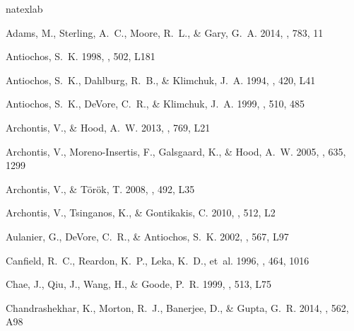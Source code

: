 \documentclass[twocolumn]{aastex6}
\begin{document}
\begin{thebibliography}{}
\expandafter\ifx\csname natexlab\endcsname\relax\def\natexlab#1{#1}\fi

{Adams}, M., {Sterling}, A.~C., {Moore}, R.~L., \& {Gary}, G.~A. 2014, \apj,
  783, 11

{Antiochos}, S.~K. 1998, \apjl, 502, L181

{Antiochos}, S.~K., {Dahlburg}, R.~B., \& {Klimchuk}, J.~A. 1994, \apjl, 420,
  L41

{Antiochos}, S.~K., {DeVore}, C.~R., \& {Klimchuk}, J.~A. 1999, \apj, 510, 485

{Archontis}, V., \& {Hood}, A.~W. 2013, \apjl, 769, L21

{Archontis}, V., {Moreno-Insertis}, F., {Galsgaard}, K., \& {Hood}, A.~W. 2005,
  \apj, 635, 1299

{Archontis}, V., \& {T{\"o}r{\"o}k}, T. 2008, \aap, 492, L35

{Archontis}, V., {Tsinganos}, K., \& {Gontikakis}, C. 2010, \aap, 512, L2

{Aulanier}, G., {DeVore}, C.~R., \& {Antiochos}, S.~K. 2002, \apjl, 567, L97

{Canfield}, R.~C., {Reardon}, K.~P., {Leka}, K.~D., {et~al.} 1996, \apj, 464,
  1016

{Chae}, J., {Qiu}, J., {Wang}, H., \& {Goode}, P.~R. 1999, \apjl, 513, L75

{Chandrashekhar}, K., {Morton}, R.~J., {Banerjee}, D., \& {Gupta}, G.~R. 2014,
  \aap, 562, A98


\end{thebibliography}
\end{document}
